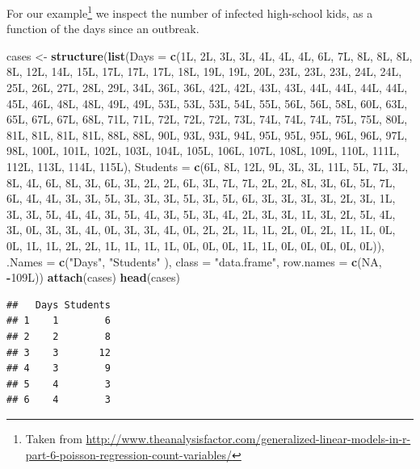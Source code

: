 \documentclass[]{book}
\newenvironment{Shaded}{\begin{snugshade}}{\end{snugshade}}
\newcommand{\KeywordTok}[1]{\textcolor[rgb]{0.13,0.29,0.53}{\textbf{#1}}}
\newcommand{\DataTypeTok}[1]{\textcolor[rgb]{0.13,0.29,0.53}{#1}}
\newcommand{\StringTok}[1]{\textcolor[rgb]{0.31,0.60,0.02}{#1}}
\newcommand{\OtherTok}[1]{\textcolor[rgb]{0.56,0.35,0.01}{#1}}
\newcommand{\OperatorTok}[1]{\textcolor[rgb]{0.81,0.36,0.00}{\textbf{#1}}}
\newcommand{\NormalTok}[1]{#1}
\theoremstyle{definition}
\theoremstyle{definition}
\theoremstyle{definition}
\theoremstyle{remark}
\begin{document}
For our example\footnote{Taken from
  \url{http://www.theanalysisfactor.com/generalized-linear-models-in-r-part-6-poisson-regression-count-variables/}}
we inspect the number of infected high-school kids, as a function of the
days since an outbreak.

\begin{Shaded}
\begin{Highlighting}[]
\NormalTok{cases <-}\StringTok{  }
\KeywordTok{structure}\NormalTok{(}\KeywordTok{list}\NormalTok{(}\DataTypeTok{Days =} \KeywordTok{c}\NormalTok{(1L, 2L, 3L, 3L, 4L, 4L, 4L, 6L, 7L, 8L, }
\NormalTok{8L, 8L, 8L, 12L, 14L, 15L, 17L, 17L, 17L, 18L, 19L, 19L, 20L, }
\NormalTok{23L, 23L, 23L, 24L, 24L, 25L, 26L, 27L, 28L, 29L, 34L, 36L, 36L, }
\NormalTok{42L, 42L, 43L, 43L, 44L, 44L, 44L, 44L, 45L, 46L, 48L, 48L, 49L, }
\NormalTok{49L, 53L, 53L, 53L, 54L, 55L, 56L, 56L, 58L, 60L, 63L, 65L, 67L, }
\NormalTok{67L, 68L, 71L, 71L, 72L, 72L, 72L, 73L, 74L, 74L, 74L, 75L, 75L, }
\NormalTok{80L, 81L, 81L, 81L, 81L, 88L, 88L, 90L, 93L, 93L, 94L, 95L, 95L, }
\NormalTok{95L, 96L, 96L, 97L, 98L, 100L, 101L, 102L, 103L, 104L, 105L, }
\NormalTok{106L, 107L, 108L, 109L, 110L, 111L, 112L, 113L, 114L, 115L), }
    \DataTypeTok{Students =} \KeywordTok{c}\NormalTok{(6L, 8L, 12L, 9L, 3L, 3L, 11L, 5L, 7L, 3L, 8L, }
\NormalTok{    4L, 6L, 8L, 3L, 6L, 3L, 2L, 2L, 6L, 3L, 7L, 7L, 2L, 2L, 8L, }
\NormalTok{    3L, 6L, 5L, 7L, 6L, 4L, 4L, 3L, 3L, 5L, 3L, 3L, 3L, 5L, 3L, }
\NormalTok{    5L, 6L, 3L, 3L, 3L, 3L, 2L, 3L, 1L, 3L, 3L, 5L, 4L, 4L, 3L, }
\NormalTok{    5L, 4L, 3L, 5L, 3L, 4L, 2L, 3L, 3L, 1L, 3L, 2L, 5L, 4L, 3L, }
\NormalTok{    0L, 3L, 3L, 4L, 0L, 3L, 3L, 4L, 0L, 2L, 2L, 1L, 1L, 2L, 0L, }
\NormalTok{    2L, 1L, 1L, 0L, 0L, 1L, 1L, 2L, 2L, 1L, 1L, 1L, 1L, 0L, 0L, }
\NormalTok{    0L, 1L, 1L, 0L, 0L, 0L, 0L, 0L)), }\DataTypeTok{.Names =} \KeywordTok{c}\NormalTok{(}\StringTok{"Days"}\NormalTok{, }\StringTok{"Students"}
\NormalTok{), }\DataTypeTok{class =} \StringTok{"data.frame"}\NormalTok{, }\DataTypeTok{row.names =} \KeywordTok{c}\NormalTok{(}\OtherTok{NA}\NormalTok{, }\OperatorTok{-}\NormalTok{109L))}
\KeywordTok{attach}\NormalTok{(cases)}
\KeywordTok{head}\NormalTok{(cases) }
\end{Highlighting}
\end{Shaded}

\begin{verbatim}
##   Days Students
## 1    1        6
## 2    2        8
## 3    3       12
## 4    3        9
## 5    4        3
## 6    4        3
\end{verbatim}
\end{document}
